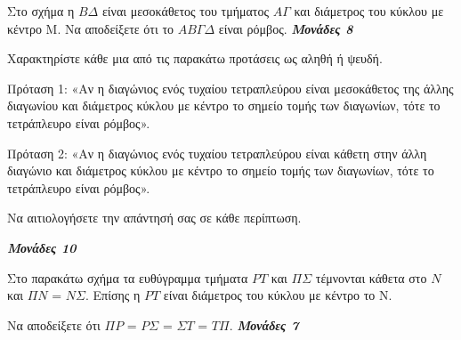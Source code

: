 \documentclass[11pt,a4paper,twoside]{book}
\newcommand{\monades}[1]{
\hspace*{\fill}
\textbf{\textit{\textcolor{maincolor}{Μονάδες #1}}}}
\begin{document}
\begin{alist}
\item Στο σχήμα η $B\varDelta  $ είναι μεσοκάθετος του τμήματος $A\varGamma $ και διάμετρος του κύκλου με κέντρο Μ. Να αποδείξετε ότι το $AB\varGamma \varDelta  $ είναι ρόμβος. \monades{8}


\begin{center}
\end{center}

\item Χαρακτηρίστε κάθε μια από τις παρακάτω προτάσεις ως αληθή ή ψευδή.

Πρόταση 1: «Αν η διαγώνιος ενός τυχαίου τετραπλεύρου είναι μεσοκάθετος της άλλης διαγωνίου και διάμετρος κύκλου με κέντρο το σημείο τομής των διαγωνίων, τότε το τετράπλευρο είναι ρόμβος».

Πρόταση 2: «Αν η διαγώνιος ενός τυχαίου τετραπλεύρου είναι κάθετη στην άλλη διαγώνιο και διάμετρος κύκλου με κέντρο το σημείο τομής των διαγωνίων, τότε το τετράπλευρο είναι ρόμβος».

Να αιτιολογήσετε την απάντησή σας σε κάθε περίπτωση.

\monades{10}

\item Στο παρακάτω σχήμα τα ευθύγραμμα τμήματα $PT$ και $\varPi\varSigma$ τέμνονται κάθετα στο $N$ και $\varPi N$ = $N\varSigma$. Επίσης η $PT$ είναι διάμετρος του κύκλου με κέντρο το Ν.

Να αποδείξετε ότι $\varPi P$ = $P\varSigma$ = $\varSigma T$ = $T\varPi$. \monades{7}



\end{alist}
\end{document}
